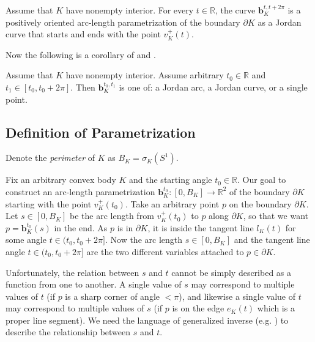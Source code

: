 \begin{theorem}

Assume that \(K\) have nonempty interior. For every \(t \in \mathbb{R}\), the curve \(\mathbf{b}_K^{t, t + 2\pi}\) is a positively oriented arc-length parametrization of the boundary \(\partial K\) as a Jordan curve that starts and ends with the point \(v_K^+(t)\).

\label{thm:param-positive-jordan}
\end{theorem}

Now the following is a corollary of  and .

\begin{corollary}

Assume that \(K\) have nonempty interior. Assume arbitrary \(t_0 \in \mathbb{R}\) and \(t_1 \in [t_0, t_0 + 2\pi]\). Then \(\mathbf{b}_K^{t_0, t_1}\) is one of: a Jordan arc, a Jordan curve, or a single point.

\label{cor:param-positive-jordan}
\end{corollary}

\subsection{Definition of Parametrization}

\begin{definition}

Denote the \emph{perimeter} of \(K\) as \(B_K = \sigma_K\left( S^1 \right)\).

\label{def:convex-body-perimeter}
\end{definition}

Fix an arbitrary convex body \(K\) and the starting angle \(t_0 \in \mathbb{R}\). Our goal to construct an arc-length parametrization \(\mathbf{b}_{K}^{t_0} : [0, B_K] \to \mathbb{R}^2\) of the boundary \(\partial K\) starting with the point \(v_K^+(t_0)\). Take an arbitrary point \(p\) on the boundary \(\partial K\). Let \(s \in [0, B_K]\) be the arc length from \(v_K^+(t_0)\) to \(p\) along \(\partial K\), so that we want \(p = \mathbf{b}_{K}^{t_0}(s)\) in the end. As \(p\) is in \(\partial K\), it is inside the tangent line \(l_K(t)\) for some angle \(t \in (t_0, t_0 + 2\pi]\). Now the arc length \(s \in [0, B_K]\) and the tangent line angle \(t \in (t_0, t_0 + 2\pi]\) are the two different variables attached to \(p \in \partial K\).

Unfortunately, the relation between \(s\) and \(t\) cannot be simply described as a function from one to another. A single value of \(s\) may correspond to multiple values of \(t\) (if \(p\) is a sharp corner of angle \(< \pi\)), and likewise a single value of \(t\) may correspond to multiple values of \(s\) (if \(p\) is on the edge \(e_K(t)\) which is a proper line segment). We need the language of generalized inverse (e.g. \autocite{fortelleStudyGeneralizedInverses}) to describe the relationship between \(s\) and \(t\).

